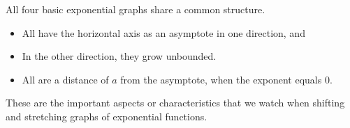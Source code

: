\documentclass{ximera}
\begin{document}
All four basic exponential graphs share a common structure.


\begin{itemize}
\item All have the horizontal axis as an asymptote in one direction, and
\item In the other direction, they grow unbounded.
\item All are a distance of $a$ from the asymptote, when the exponent equals $0$.
\end{itemize}

These are the important aspects or characteristics that we watch when shifting and stretching graphs of exponential functions.
\end{document}
